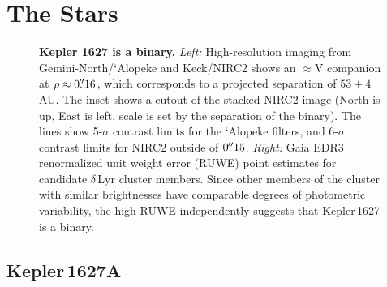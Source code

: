 \documentclass[12pt,modern,twocolumn,tighten]{aastex63}
\begin{document}
\section{The Stars}
\label{sec:stars}

\begin{figure}[tp]
	\begin{center}
		\leavevmode
	\end{center}
	\vspace{-0.5cm}
	\caption{
		{\bf Kepler 1627 is a binary.} {\it Left:} High-resolution imaging
		from Gemini-North/`Alopeke and Keck/NIRC2 shows an $\approx$V
		companion at $\rho \approx 0\mbox{$.\!\!^{\prime\prime}$}16$, which corresponds to a
		projected separation of $53\pm4$\,AU.  The inset shows a cutout of
		the stacked NIRC2 image (North is up, East is left, scale is set
		by the separation of the binary).  The lines show 5-$\sigma$
		contrast limits for the `Alopeke filters, and 6-$\sigma$ contrast
		limits for NIRC2 outside of $0\mbox{$.\!\!^{\prime\prime}$}15$. {\it Right:} Gaia EDR3
		renormalized unit weight error (RUWE) point estimates for
		candidate $\delta$\,Lyr cluster members.  Since other members of
		the cluster with similar brightnesses have comparable degrees of
		photometric variability, the high RUWE independently suggests that
		Kepler\,1627 is a binary. 
		\label{fig:kep1627binary}
	}
\end{figure}

\subsection{Kepler\,1627A}
\end{document}
